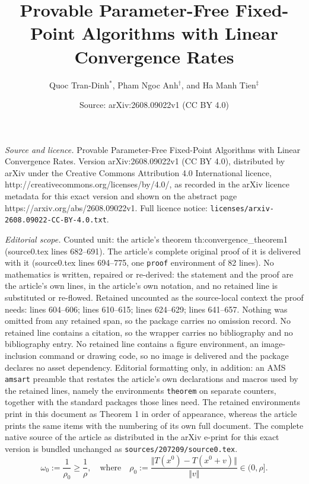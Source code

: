 \documentclass[10pt,a4paper]{amsart}
\title{Provable Parameter-Free Fixed-Point Algorithms with Linear Convergence Rates}
\author{Quoc Tran-Dinh$^{*}$, Pham Ngoc Anh$^{\dagger}$, and Ha Manh Tien$^{\ddagger}$}
\date{Source: arXiv:2608.09022v1 (CC BY 4.0)}
\newcommand{\norms}[1]{\Vert#1\Vert}
\begin{document}
\maketitle

\noindent\emph{Source and licence.} Provable Parameter-Free Fixed-Point Algorithms with Linear Convergence Rates. Version arXiv:2608.09022v1 (CC BY 4.0), distributed by arXiv under the Creative Commons Attribution 4.0 International licence, http://creativecommons.org/licenses/by/4.0/, as recorded in the arXiv licence metadata for this exact version and shown on the abstract page https://arxiv.org/abs/2608.09022v1. Full licence notice: \texttt{licenses/arxiv-2608.09022-CC-BY-4.0.txt}.\par\smallskip

\noindent\textit{Editorial scope.} Counted unit: the article's theorem th:convergence\_theorem1 (source0.tex lines 682--691). The article's complete original proof of it is delivered with it (source0.tex lines 694--775, one \texttt{proof} environment of 82 lines). No mathematics is written, repaired or re-derived: the statement and the proof are the article's own lines, in the article's own notation, and no retained line is substituted or re-flowed.  Retained uncounted as the source-local context the proof needs: lines 604--606; lines 610--615; lines 624--629; lines 641--657.  Nothing was omitted from any retained span, so the package carries no omission record.  No retained line contains a citation, so the wrapper carries no bibliography and no bibliography entry.  No retained line contains a figure environment, an image-inclusion command or drawing code, so no image is delivered and the package declares no asset dependency.  Editorial formatting only, in addition: an AMS \texttt{amsart} preamble that restates the article's own declarations and macros used by the retained lines, namely the environments \texttt{theorem} on separate counters, together with the standard packages those lines need.  The retained environments print in this document as Theorem 1 in order of appearance, whereas the article prints the same items with the numbering of its own full document.  The complete native source of the article as distributed in the arXiv e-print for this exact version is bundled unchanged as \texttt{sources/207209/source0.tex}.
\begin{equation}\label{eq:omega_0_choice}
\omega_0 := \frac{1}{\rho_0} \geq \frac{1}{\rho},\quad \textrm{where} \quad \rho_0 := \frac{\norms{T(x^0) - T(x^0 + v)}}{\norms{v}} \in (0,  \rho].
\end{equation}
\end{document}
